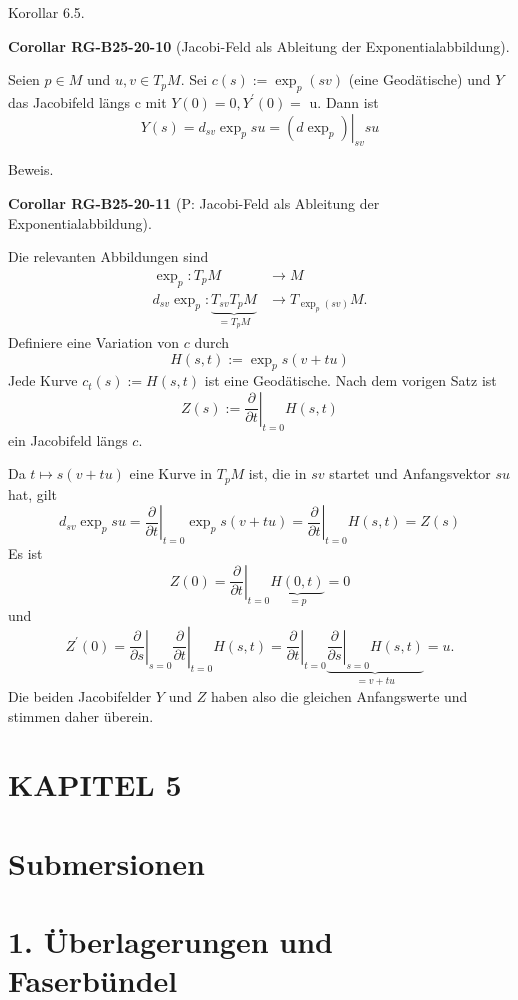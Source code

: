 \documentclass[10pt, letterpaper]{article}
\newcommand{\CustomHeading}[3]{%
  \par\medskip\noindent%
  \textbf{#1 #2} \textnormal{(#3)}.\enskip%
}
\newenvironment{KORO}[2]{\begin{unitbox}\CustomHeading{Corollar}{#1}{#2}}{\end{unitbox}}
\begin{document}
Korollar 6.5. 


\begin{KORO}{RG-B25-20-10}{Jacobi-Feld als Ableitung der Exponentialabbildung}
Seien $p \in M$ und $u, v \in T_{p} M$. Sei $c(s):=\exp _{p}(s v)$ (eine Geodätische) und $Y$ das Jacobifeld längs c mit $Y(0)=0, Y^{\prime}(0)=$ u. Dann ist
$$
Y(s)=d_{s v} \exp _{p} s u=\left.\left(d \exp _{p}\right)\right|_{s v} s u
$$
\end{KORO}


Beweis. 

\begin{KORO}{RG-B25-20-11}{P: Jacobi-Feld als Ableitung der Exponentialabbildung}
Die relevanten Abbildungen sind
$$
\begin{aligned}
\exp _{p}: T_{p} M & \rightarrow M \\
d_{s v} \exp _{p}: \underbrace{T_{s v} T_{p} M}_{=T_{p} M} & \rightarrow T_{\exp _{p}(s v)} M .
\end{aligned}
$$
Definiere eine Variation von $c$ durch
$$
H(s, t):=\exp _{p} s(v+t u)
$$
Jede Kurve $c_{t}(s):=H(s, t)$ ist eine Geodätische. Nach dem vorigen Satz ist
$$
Z(s):=\left.\frac{\partial}{\partial t}\right|_{t=0} H(s, t)
$$
ein Jacobifeld längs $c$.

Da $t \mapsto s(v+t u)$ eine Kurve in $T_{p} M$ ist, die in $s v$ startet und Anfangsvektor $s u$ hat, gilt
$$
d_{s v} \exp _{p} s u=\left.\frac{\partial}{\partial t}\right|_{t=0} \exp _{p} s(v+t u)=\left.\frac{\partial}{\partial t}\right|_{t=0} H(s, t)=Z(s)
$$
Es ist
$$
Z(0)=\left.\frac{\partial}{\partial t}\right|_{t=0} \underbrace{H(0, t)}_{=p}=0
$$
und
$$
Z^{\prime}(0)=\left.\left.\frac{\partial}{\partial s}\right|_{s=0} \frac{\partial}{\partial t}\right|_{t=0} H(s, t)=\left.\frac{\partial}{\partial t}\right|_{t=0} \underbrace{\left.\frac{\partial}{\partial s}\right|_{s=0} H(s, t)}_{=v+t u}=u .
$$
Die beiden Jacobifelder $Y$ und $Z$ haben also die gleichen Anfangswerte und stimmen daher überein.
\end{KORO}



\pagebreak


\section*{KAPITEL 5}
\section*{Submersionen}
\section*{1. Überlagerungen und Faserbündel}
\end{document}
